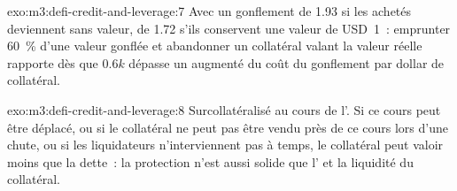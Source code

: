 \begin{solution}{exo:m3:defi-credit-and-leverage:7}
Avec un gonflement de 1.93 si les  achetés deviennent sans valeur, de 1.72 s'ils conservent une valeur de USD~1~: emprunter 60~\% d'une valeur gonflée et abandonner un collatéral
valant la valeur réelle rapporte dès que $0.6k$ dépasse un augmenté du coût du gonflement par dollar de collatéral.
\end{solution}

\begin{solution}{exo:m3:defi-credit-and-leverage:8}
Surcollatéralisé au cours de l'. Si ce cours peut être déplacé, ou si le collatéral ne peut pas être vendu près de ce cours lors d'une chute, ou si les liquidateurs n'interviennent pas à temps,
le collatéral peut valoir moins que la dette~: la protection n'est aussi solide que l' et la liquidité du collatéral.
\end{solution}

